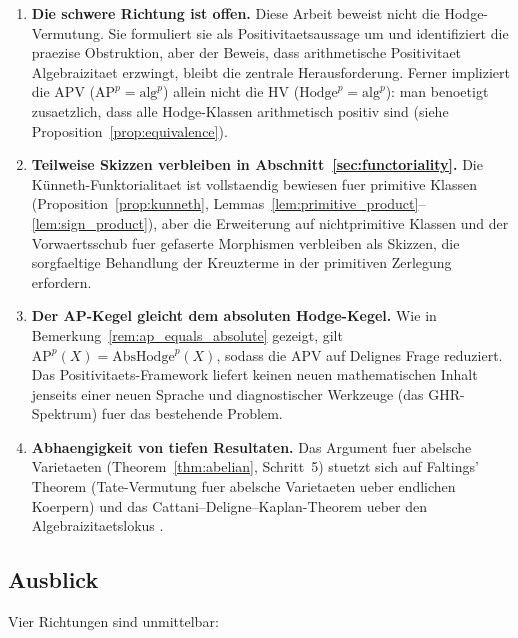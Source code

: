 \documentclass[aps,prd,twocolumn,superscriptaddress,nofootinbib]{revtex4-2}
\theoremstyle{definition}
\theoremstyle{remark}
\begin{document}
\begin{enumerate}
\item \textbf{Die schwere Richtung ist offen.} Diese Arbeit beweist nicht die Hodge-Vermutung. Sie formuliert sie als Positivitaetsaussage um und identifiziert die praezise Obstruktion, aber der Beweis, dass arithmetische Positivitaet Algebraizitaet erzwingt, bleibt die zentrale Herausforderung. Ferner impliziert die APV ($\mathrm{AP}^p = \mathrm{alg}^p$) allein nicht die HV ($\mathrm{Hodge}^p = \mathrm{alg}^p$): man benoetigt zusaetzlich, dass alle Hodge-Klassen arithmetisch positiv sind (siehe Proposition~\ref{prop:equivalence}).

\item \textbf{Teilweise Skizzen verbleiben in Abschnitt~\ref{sec:functoriality}.} Die K\"unneth-Funktorialitaet ist vollstaendig bewiesen fuer primitive Klassen (Proposition~\ref{prop:kunneth}, Lemmas~\ref{lem:primitive_product}--\ref{lem:sign_product}), aber die Erweiterung auf nichtprimitive Klassen und der Vorwaertsschub fuer gefaserte Morphismen verbleiben als Skizzen, die sorgfaeltige Behandlung der Kreuzterme in der primitiven Zerlegung erfordern.

\item \textbf{Der AP-Kegel gleicht dem absoluten Hodge-Kegel.} Wie in Bemerkung~\ref{rem:ap_equals_absolute} gezeigt, gilt $\mathrm{AP}^p(X) = \mathrm{AbsHodge}^p(X)$, sodass die APV auf Delignes Frage reduziert. Das Positivitaets-Framework liefert keinen neuen mathematischen Inhalt jenseits einer neuen Sprache und diagnostischer Werkzeuge (das GHR-Spektrum) fuer das bestehende Problem.

\item \textbf{Abhaengigkeit von tiefen Resultaten.} Das Argument fuer abelsche Varietaeten (Theorem~\ref{thm:abelian}, Schritt~5) stuetzt sich auf Faltings' Theorem (Tate-Vermutung fuer abelsche Varietaeten ueber endlichen Koerpern) \cite{Faltings1983} und das Cattani--Deligne--Kaplan-Theorem ueber den Algebraizitaetslokus \cite{CattaniDeligneKaplan1995}.
\end{enumerate}

\subsection{Ausblick}

Vier Richtungen sind unmittelbar:
\end{document}
